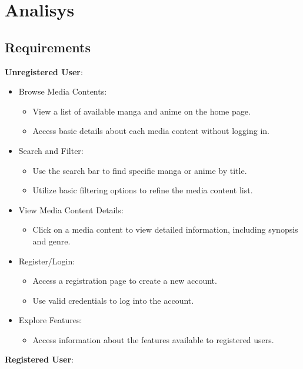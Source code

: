 \chapter{Analisys}

\section{Requirements}
\textbf{Unregistered User}:

\begin{itemize}
    \item Browse Media Contents:
    \begin{itemize}
        \item View a list of available manga and anime on the home page.
        \item Access basic details about each media content without logging in.
    \end{itemize}
    \item Search and Filter:
    \begin{itemize}
        \item Use the search bar to find specific manga or anime by title.
        \item Utilize basic filtering options to refine the media content list.
    \end{itemize}
    \item View Media Content Details:
    \begin{itemize}
        \item Click on a media content to view detailed information, including synopsis and genre.
    \end{itemize}
    \item Register/Login:
    \begin{itemize}
        \item Access a registration page to create a new account.
        \item Use valid credentials to log into the account.
    \end{itemize}
    \item Explore Features:
    \begin{itemize}
        \item Access information about the features available to registered users.
    \end{itemize}
\end{itemize}

\textbf{Registered User}:

